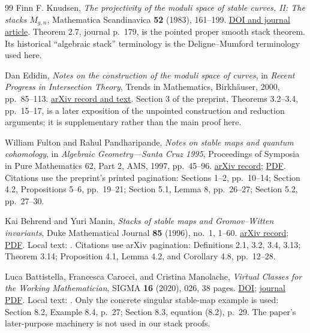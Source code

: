 \begin{thebibliography}{99}
Finn F. Knudsen, \emph{The projectivity of the moduli space of
stable curves, II: The stacks $M_{g,n}$}, Mathematica Scandinavica
\textbf{52} (1983), 161--199.
\href{https://doi.org/10.7146/math.scand.a-12001}{DOI and journal article}.
Theorem 2.7, journal p.~179, is the pointed proper smooth stack
theorem. Its historical ``algebraic stack'' terminology is the
Deligne--Mumford terminology used here.

Dan Edidin, \emph{Notes on the construction of the moduli space
of curves}, in \emph{Recent Progress in Intersection Theory},
Trends in Mathematics, Birkh\"auser, 2000, pp.~85--113.
\href{https://arxiv.org/abs/math/9805101}{arXiv record and text}.
Section 3 of the preprint, Theorems 3.2--3.4, pp.~15--17,
is a later exposition of the unpointed construction and reduction
arguments; it is supplementary rather than the main proof here.

William Fulton and Rahul Pandharipande, \emph{Notes on stable
maps and quantum cohomology}, in \emph{Algebraic Geometry---Santa
Cruz 1995}, Proceedings of Symposia in Pure Mathematics 62,
Part 2, AMS, 1997, pp.~45--96.
\href{https://arxiv.org/abs/alg-geom/9608011}{arXiv record};
\href{https://arxiv.org/pdf/alg-geom/9608011}{PDF}.
Citations use the preprint's printed pagination: Sections 1--2,
pp.~10--14; Section 4.2, Propositions 5--6, pp.~19--21;
Section 5.1, Lemma 8, pp.~26--27; Section 5.2, pp.~27--30.

Kai Behrend and Yuri Manin, \emph{Stacks of stable maps and
Gromov--Witten invariants}, Duke Mathematical Journal
\textbf{85} (1996), no.~1, 1--60.
\href{https://arxiv.org/abs/alg-geom/9506023}{arXiv record};
\href{https://arxiv.org/pdf/alg-geom/9506023}{PDF}.
Local text: .
Citations use arXiv pagination: Definitions 2.1, 3.2, 3.4,
3.13; Theorem 3.14; Proposition 4.1, Lemma 4.2, and
Corollary 4.8, pp.~12--28.

Luca Battistella, Francesca Carocci, and Cristina Manolache,
\emph{Virtual Classes for the Working Mathematician}, SIGMA
\textbf{16} (2020), 026, 38 pages.
\href{https://doi.org/10.3842/SIGMA.2020.026}{DOI};
\href{https://www.emis.de/journals/SIGMA/2020/026/sigma20-026.pdf}{journal PDF}.
Local text: .
Only the concrete singular stable-map example is used:
Section 8.2, Example 8.4, p.~27; Section 8.3, equation (8.2),
p.~29. The paper's later-purpose machinery is not used in our
stack proofs.


\end{thebibliography}
